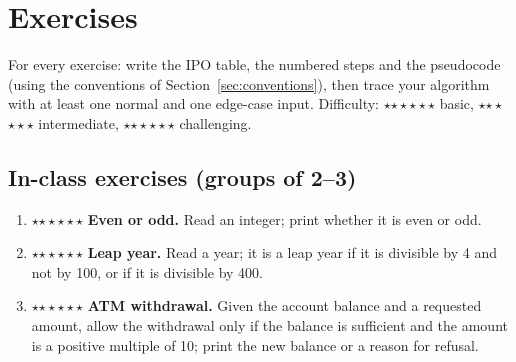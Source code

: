 \documentclass[11pt,a4paper]{article}
\newif\ifsolutions
\newcommand{\READ}{\textbf{READ}\ }
\newcommand{\PRINT}{\textbf{PRINT}\ }
\newcommand{\START}{\State \textbf{START}}
\newcommand{\STOP}{\State \textbf{END}}
\newcommand{\AND}{\ \textbf{AND}\ }
\newcommand{\OR}{\ \textbf{OR}\ }
\newcommand{\MOD}{\mathbin{\mathrm{mod}}}
\newcommand{\str}[1]{\texttt{"#1"}}
\newcommand{\solution}[1]{\ifsolutions\begin{solbox}#1\end{solbox}\fi}
\newcommand{\stars}[1]{\textcolor{amberdk}{\ifcase#1\or$\star$\or$\star\star$\or$\star\star\star$\fi}}
\begin{document}
\section{Exercises}\label{sec:exercises}
For every exercise: write the IPO table, the numbered steps and the pseudocode (using the conventions of Section~\ref{sec:conventions}), then trace your algorithm with at least one normal and one edge-case input. Difficulty: \stars{1} basic, \stars{2} intermediate, \stars{3} challenging.

\subsection{In-class exercises (groups of 2--3)}
\begin{enumerate}[label=\textbf{\Alph*.},leftmargin=*,itemsep=3pt]
  \item \stars{1} \textbf{Even or odd.} Read an integer; print whether it is even or odd.
  \solution{$n$ is even exactly when $n \MOD 2 = 0$.
  \begin{algorithmic}[1]
  \START \State \READ $n$
  \IfX{$n \MOD 2 = 0$} \State \PRINT \str{even} \ElseX \State \PRINT \str{odd} \EndIfX \STOP
  \end{algorithmic}
  Tests: $7\to$ odd, $10\to$ even, $0\to$ even. (For negative $n$ the C\# \texttt{\%} gives $-1$ for odd numbers, so test ``$\ne 0$'' rather than ``$=1$''.)}

  \item \stars{2} \textbf{Leap year.} Read a year; it is a leap year if it is divisible by 4 and not by 100, or if it is divisible by 400.
  \solution{
  \begin{algorithmic}[1]
  \START \State \READ $y$
  \IfX{($y \MOD 4 = 0$ \AND $y \MOD 100 \ne 0$) \OR $y \MOD 400 = 0$}
    \State \PRINT \str{leap year}
  \ElseX \State \PRINT \str{not a leap year} \EndIfX \STOP
  \end{algorithmic}
  Tests: $2024$ leap; $2023$ not; $1900$ not (divisible by 100 but not 400); $2000$ leap (divisible by 400).}

  \item \stars{2} \textbf{ATM withdrawal.} Given the account balance and a requested amount, allow the withdrawal only if the balance is sufficient and the amount is a positive multiple of 10; print the new balance or a reason for refusal.
  \solution{
  \begin{algorithmic}[1]
  \START \State \READ $balance$, $amount$
  \IfX{$amount \le 0$ \OR $amount \MOD 10 \ne 0$}
    \State \PRINT \str{invalid amount}
  \ElseX
    \IfX{$amount > balance$} \State \PRINT \str{insufficient funds}
    \ElseX \State $balance \gets balance - amount$ \State \PRINT \str{new balance:}, $balance$ \EndIfX
  \EndIfX \STOP
  \end{algorithmic}
  Tests: $(500,200)\to 300$; $(500,500)\to 0$ (boundary); $(500,510)\to$ insufficient; $(500,25)\to$ invalid; $(500,-10)\to$ invalid.}


\end{enumerate}
\end{document}

